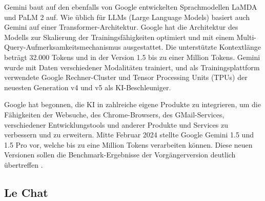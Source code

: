Gemini baut auf den ebenfalls von Google entwickelten Sprachmodellen LaMDA und PaLM 2 auf. Wie üblich für 
LLMs (Large Language Models) basiert auch Gemini auf einer Transformer-Architektur. Google hat die Architektur des 
Modells zur Skalierung der Trainingsfähigkeiten optimiert und mit einem Multi-Query-Aufmerksamkeitsmechanismus ausgestattet. 
Die unterstützte Kontextlänge beträgt 32.000 Tokens und in der Version 1.5 bis zu einer Million Tokens. Gemini wurde mit 
Daten verschiedener Modalitäten trainiert, und als Trainingsplattform verwendete Google Rechner-Cluster und Tensor 
Processing Units (TPUs) der neuesten Generation v4 und v5 als KI-Beschleuniger.

Google hat begonnen, die KI in zahlreiche eigene Produkte zu integrieren, um die Fähigkeiten der Websuche, des 
Chrome-Browsers, des GMail-Services, verschiedener Entwicklungstools und anderer Produkte und Services zu verbessern 
und zu erweitern. Mitte Februar 2024 stellte Google Gemini 1.5 und 1.5 Pro vor, welche bis zu eine Million Tokens 
verarbeiten können. Diese neuen Versionen sollen die Benchmark-Ergebnisse der Vorgängerversion deutlich übertreffen \cite{GrundlagenGemini}.

\FloatBarrier

\subsection{Le Chat}  \label{Le Chat}

